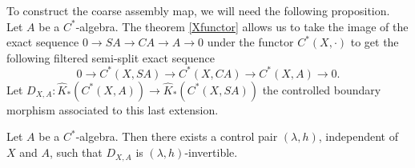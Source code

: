 
To construct the coarse assembly map, we will need the following proposition.\\
 
Let $A$ be a $C^*$-algebra. The theorem \ref{Xfunctor} allows us to take the image of the exact sequence $0 \rightarrow SA \rightarrow CA \rightarrow A \rightarrow 0 $ under the functor $C^*(X,\cdot)$ to get the following filtered semi-split exact sequence 
\[0 \rightarrow C^*(X,SA) \rightarrow C^*(X,CA) \rightarrow C^*(X,A) \rightarrow 0.\] 
Let $D_{X,A} : \hat K_*(C^*(X,A))\rightarrow \hat K_*(C^*(X,SA))$ the controlled boundary morphism associated to this last extension.

\begin{prop}\label{InverseEven}
Let $A$ be a $C^*$-algebra. 
Then there exists a control pair $(\lambda,h)$, independent of $X$ and $A$, such that $D_{X,A}$ is $(\lambda,h)$-invertible.
\end{prop}

